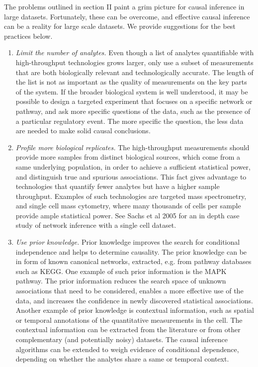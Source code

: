 \documentclass[journal=jacsat,manuscript=article]{achemso}
\begin{document}
The problems outlined in section II paint a grim picture for causal inference in large datasets. Fortunately, these can be overcome, and effective causal inference can be a reality for large scale datasets.  We provide suggestions for the best practices below.


\begin{enumerate}
\item \textit{Limit the number of analytes.} Even though a list of analytes quantifiable with high-throughput technologies grows larger, only use a subset of measurements that are both biologically relevant and technologically accurate. The length of the list is not as important as the quality of measurements on the key parts of the system.  If the broader biological system is well understood, it may be possible to design a targeted experiment that focuses on a specific network or pathway, and ask more specific questions of the data, such as the presence of a particular regulatory event.  The more specific the question, the less data are needed to make solid causal conclusions.  

\item \textit{Profile more biological replicates.}  The high-throughput measurements should provide more samples from distinct biological sources, which come from a same underlying population, in order to achieve a sufficient statistical power, and distinguish true and spurious associations.  This fact gives advantage to technologies that quantify fewer analytes but have a higher sample throughput. Examples of such technologies are targeted mass spectrometry, and single cell mass cytometry, where  many thousands of cells per sample provide ample statistical power. See Sachs et al 2005 for an in depth case study of network inference with a single cell dataset. \cite{sachs2005causal}

\item \textit{Use prior knowledge.} Prior knowledge improves the search for conditional independence and helps to determine causality. The prior knowledge can be in form of known canonical networks, extracted, e.g. from pathway databases such as KEGG. One example of such prior information is the MAPK pathway. The prior information reduces the search space of unknown associations that need to be considered, enables a more effective use of the data, and increases the confidence in newly discovered statistical associations.  Another example of prior knowledge is contextual information, such as spatial or temporal annotations of the quantitative measurements in the cell. The contextual information can be extracted from the literature or from other complementary (and potentially noisy) datasets. The causal inference algorithms can be extended to weigh evidence of conditional dependence, depending on whether the analytes share a same or temporal context. 


\end{enumerate}
\end{document}
